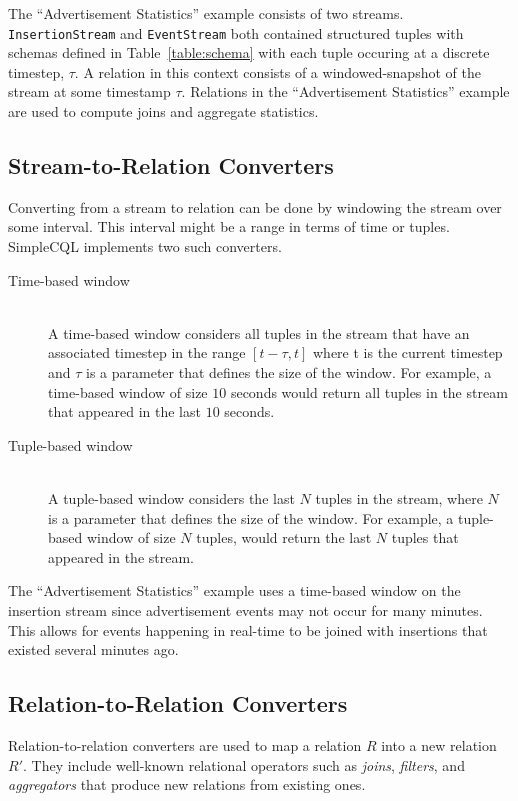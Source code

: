 \documentclass[a4paper, 10pt, conference]{IEEEconf}
\begin{document}
The ``Advertisement Statistics'' example consists of two streams.  \texttt{InsertionStream} and \texttt{EventStream} both contained structured tuples with schemas defined in Table~\ref{table:schema} with each tuple occuring at a discrete timestep, $\tau$.  A relation in this context consists of a windowed-snapshot of the stream at some timestamp $\tau$.  Relations in the ``Advertisement Statistics'' example are used to compute joins and aggregate statistics.

\subsection{Stream-to-Relation Converters}
Converting from a stream to relation can be done by windowing the stream over some interval.  This interval might be a range in terms of time or tuples.  SimpleCQL implements two such converters.

\begin{description}
  \item[Time-based window] \hfill \\
  A time-based window considers all tuples in the stream that have an associated timestep in the range $[t-\tau, t]$ where t is the current timestep and $\tau$ is a parameter that defines the size of the window. For example, a time-based window of size $10$ seconds would return all tuples in the stream that appeared in the last $10$ seconds.
  
  \item[Tuple-based window] \hfill \\
  A tuple-based window considers the last $N$ tuples in the stream, where $N$ is a parameter that defines the size of the window. For example, a tuple-based window of size $N$ tuples, would return the last $N$ tuples that appeared in the stream.
\end{description}

The ``Advertisement Statistics'' example uses a time-based window on the insertion stream since advertisement events may not occur for many minutes.  This allows for events happening in real-time to be joined with insertions that existed several minutes ago.

\subsection{Relation-to-Relation Converters}

Relation-to-relation converters are used to map a relation $R$ into a new relation $R'$.  They include well-known relational operators such as \textit{joins}, \textit{filters}, and \textit{aggregators} that produce new relations from existing ones. 
\end{document}
